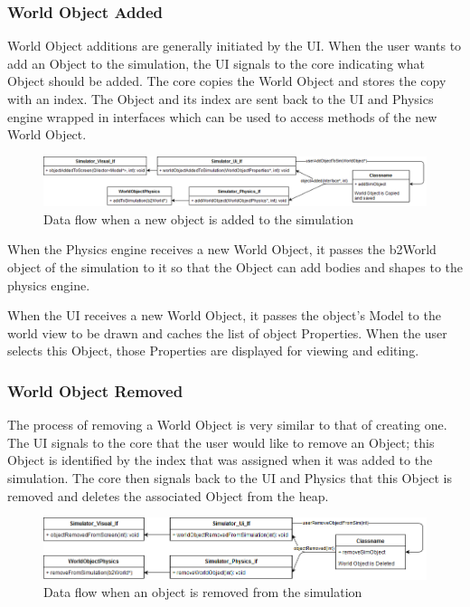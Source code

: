  \subsubsection*{World Object Added}
 	World Object additions are generally initiated by the UI. When the user wants to add an Object to the simulation, the UI signals to the core indicating what Object should be added. The core copies the World Object and stores the copy with an index. The Object and its index are sent back to the UI and Physics engine wrapped in interfaces which can be used to access methods of the new World Object.
 	
 	\begin{figure}[h]
 		\centering
 		\includegraphics[width=\textwidth]{./images_design/uml/event_addObject}
 		\caption{Data flow when a new object is added to the simulation\label{uml:addevent}}
 	\end{figure}
 	
 	When the Physics engine receives a new World Object, it passes the b2World object
of the simulation to it so that the Object can add bodies and shapes to the physics engine.

	When the UI receives a new World Object, it passes the object's Model to the world view to be drawn and caches the list of object Properties. When the user selects this Object, those Properties are displayed for viewing and editing.
	
 \subsubsection*{World Object Removed}
 The process of removing a World Object is very similar to that of creating one. The UI signals to the core that the user would like to remove an Object; this Object is identified by the index that was assigned when it was added to the simulation. The core then signals back to the UI and Physics that this Object is removed and deletes the associated Object from the heap.
 
 	\begin{figure}[h]
 		\centering
 		\includegraphics[width=\textwidth]{./images_design/uml/event_removeObject}
 		\caption{Data flow when an object is removed from the simulation\label{uml:removeevent}}
 	\end{figure} 
 
